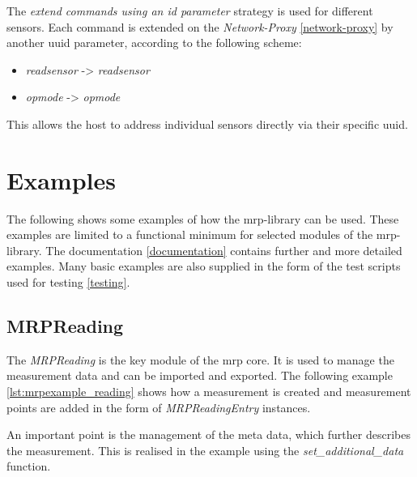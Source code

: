 The \emph{extend commands using an id parameter} strategy is used for
different sensors. Each command is extended on the \emph{Network-Proxy}
\ref{network-proxy} by another \gls{uuid} parameter, according to the
following scheme:

\begin{itemize}
\tightlist
\item
  \emph{readsensor } -\textgreater{} \emph{readsensor }
\item
  \emph{opmode} -\textgreater{} \emph{opmode }
\end{itemize}

This allows the host to address individual sensors directly via their
specific \gls{uuid}.

\hypertarget{examples}{%
\section{Examples}\label{examples}}

The following shows some examples of how the \gls{mrp}-library can be
used. These examples are limited to a functional minimum for selected
modules of the \gls{mrp}-library. The documentation \ref{documentation}
contains further and more detailed examples. Many basic examples are
also supplied in the form of the test scripts used for testing
\ref{testing}.

\hypertarget{mrpreading}{%
\subsection{MRPReading}\label{mrpreading}}

The \emph{MRPReading} is the key module of the \gls{mrp} core. It is
used to manage the measurement data and can be imported and exported.
The following example \ref{lst:mrpexample_reading} shows how a
measurement is created and measurement points are added in the form of
\emph{MRPReadingEntry} instances.

An important point is the management of the meta data, which further
describes the measurement. This is realised in the example using the
\emph{set\_additional\_data} function.

